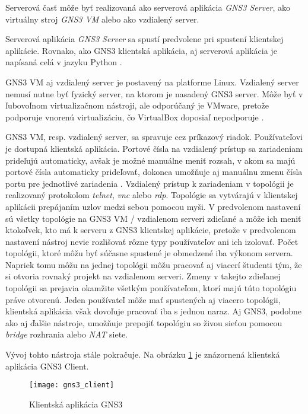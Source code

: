Serverová časť môže byť realizovaná ako serverová aplikácia \emph{GNS3 Server}, ako virtuálny stroj \emph{GNS3 VM} alebo ako vzdialený server.

Serverová aplikácia \emph{GNS3 Server} sa spustí predvolene pri spustení klientskej aplikácie. Rovnako, ako GNS3 klientská aplikácia, aj serverová aplikácia je napísaná celá v jazyku Python \cite{gns3_server_github}.

GNS3 VM aj vzdialený server je postavený na platforme Linux. Vzdialený server nemusí nutne byť fyzický server, na ktorom je nasadený GNS3 server. Môže byť v ľubovoľnom virtualizačnom nástroji, ale odporúčaný je VMware, pretože podporuje vnorenú virtualizáciu, čo VirtualBox doposiaľ nepodporuje \cite{nested_virtualization}.

GNS3 VM, resp. vzdialený server, sa spravuje cez príkazový riadok. Používateľovi je dostupná klientská aplikácia. Portové čísla na vzdialený prístup sa zariadeniam prideľujú automaticky, avšak je možné manuálne meniť rozsah, v akom sa majú portové čísla automaticky prideľovať, dokonca umožňuje aj manuálnu zmenu čísla portu pre jednotlivé zariadenia \cite{gns3_console_ports, gns3_console_ports_remote}. Vzdialený prístup k zariadeniam v topológii je realizovaný protokolom \emph{telnet}, \emph{vnc} alebo \emph{rdp}. Topológie sa vytvárajú v klientskej aplikácii prepájaním uzlov medzi sebou pomocou myši. V predvolenom nastavení sú všetky topológie na GNS3 VM / vzdialenom serveri zdieľané a môže ich meniť ktokoľvek, kto má k serveru z GNS3 klientskej aplikácie, pretože v predvolenom nastavení nástroj nevie rozlišovať rôzne typy používateľov ani ich izolovať. Počet topológii, ktoré môžu byť súčasne spustené je obmedzené iba výkonom servera. Napriek tomu môžu na jednej topológii môžu pracovať aj viacerí študenti tým, že si otvoria rovnaký projekt na vzdialenom serveri. Zmeny v takejto zdieľanej topológii sa prejavia okamžite všetkým používateľom, ktorí majú túto topológiu práve otvorenú. Jeden používateľ môže mať spustených aj viacero topológii, klientská aplikácia však dovoľuje pracovať iba s jednou naraz. Aj GNS3, podobne ako aj ďalšie nástroje, umožňuje prepojiť topológiu so živou sieťou pomocou \emph{bridge} rozhrania alebo \emph{NAT} siete.

Vývoj tohto nástroja stále pokračuje. Na obrázku \ref{obr:gns3_client} je znázornená klientská aplikácia GNS3 Client.

\setlength{\textfloatsep}{50pt}

\begin{figure}
    \centering
    \texttt{[image: gns3\_client]}
    \caption{Klientská aplikácia GNS3}
    \label{obr:gns3_client}
\end{figure}





